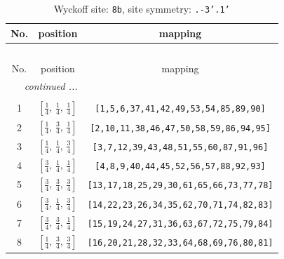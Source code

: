\documentclass[fleqn,8pt]{jsarticle}
\begin{document}
\begin{longtable}{ccc}
\caption{Wyckoff site: {\tt 8b}, site symmetry: {\tt .-3'.1'}}
 \\
 \hline \hline
No. & position & mapping \\ \hline \endfirsthead

\multicolumn{2}{l}{\tablename\ \thetable{}} \\
 \hline \hline
No. & position & mapping \\ \hline \endhead

 \hline \hline
\multicolumn{2}{r}{\footnotesize\it continued ...} \\ \endfoot

 \hline \hline
\multicolumn{2}{r}{} \\ \endlastfoot

1 & $\left[ \frac{1}{4},\, \frac{1}{4},\, \frac{1}{4} \right]$ & {\tt [1,5,6,37,41,42,49,53,54,85,89,90]} \\ \hline
2 & $\left[ \frac{1}{4},\, \frac{3}{4},\, \frac{1}{4} \right]$ & {\tt [2,10,11,38,46,47,50,58,59,86,94,95]} \\ \hline
3 & $\left[ \frac{1}{4},\, \frac{1}{4},\, \frac{3}{4} \right]$ & {\tt [3,7,12,39,43,48,51,55,60,87,91,96]} \\ \hline
4 & $\left[ \frac{3}{4},\, \frac{1}{4},\, \frac{1}{4} \right]$ & {\tt [4,8,9,40,44,45,52,56,57,88,92,93]} \\ \hline
5 & $\left[ \frac{3}{4},\, \frac{3}{4},\, \frac{3}{4} \right]$ & {\tt [13,17,18,25,29,30,61,65,66,73,77,78]} \\ \hline
6 & $\left[ \frac{3}{4},\, \frac{1}{4},\, \frac{3}{4} \right]$ & {\tt [14,22,23,26,34,35,62,70,71,74,82,83]} \\ \hline
7 & $\left[ \frac{3}{4},\, \frac{3}{4},\, \frac{1}{4} \right]$ & {\tt [15,19,24,27,31,36,63,67,72,75,79,84]} \\ \hline
8 & $\left[ \frac{1}{4},\, \frac{3}{4},\, \frac{3}{4} \right]$ & {\tt [16,20,21,28,32,33,64,68,69,76,80,81]} \\
\end{longtable}
\renewcommand{\arraystretch}{1.2}
\end{document}
